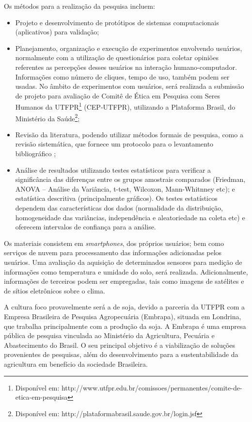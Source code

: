 \documentclass[12pt]{article}
\begin{document}
Os métodos para a realização da pesquisa incluem:

\begin{itemize}
	\item Projeto e desenvolvimento de protótipos de sistemas computacionais (aplicativos) para validação;
	\item Planejamento, organização e execução de experimentos envolvendo usuários, normalmente com a utilização de questionários para coletar opiniões referentes as percepções desses usuários na interação humano-computador. Informações como número de cliques, tempo de uso, também podem ser usadas. No âmbito de experimentos com usuários, será realizada a submissão de projeto para avaliação de Comitê de Ética em Pesquisa com Seres Humanos da UTFPR\footnote{Disponível em: http://www.utfpr.edu.br/comissoes/permanentes/comite-de-etica-em-pesquisa} (CEP-UTFPR), utilizando a Plataforma Brasil, do Ministério da Saúde\footnote{Disponível em: http://plataformabrasil.saude.gov.br/login.jsf};
	\item Revisão da literatura, podendo utilizar métodos formais de pesquisa, como a revisão sistemática, que fornece um protocolo para o levantamento bibliográfico \cite{Kitchenham:2004};
	\item Análise de resultados utilizando testes estatísticos para verificar a significância das diferenças entre os grupos amostrais comparados (Friedman, ANOVA – Análise da Variância, t-test, Wilcoxon, Mann-Whitnney etc); e estatística descritiva (principalmente gráficos). Os testes estatísticos dependem das características dos dados (normalidade da distribuição, homogeneidade das variâncias, independência e aleatoriedade na coleta etc) e oferecem intervalos de confiança para a análise.
\end{itemize}

Os materiais consistem em \textit{smartphones}, dos próprios usuários; bem como serviços de nuvem para processamento das informações adicionadas pelos usuários. Uma avaliação da aquisição de determinados sensores para medição de informações como temperatura e umidade do solo, será realizada. Adicionalmente, informações de terceiros podem ser empregadas, tais como imagens de satélites e de sítios eletrônicos sobre o clima. 		

A cultura foco provavelmente será a de soja, devido a parceria da UTFPR com a Empresa Brasileira de Pesquisa Agropecuária (Embrapa), situada em Londrina, que trabalha principalmente com a produção da soja. A Embrapa é uma empresa pública de pesquisa vinculada ao Ministério da Agricultura, Pecuária e Abastecimento do Brasil. O seu principal objetivo é a viabilização de soluções provenientes de pesquisas, além do desenvolvimento para a sustentabilidade da agricultura em benefício da sociedade Brasileira. 
\end{document}
